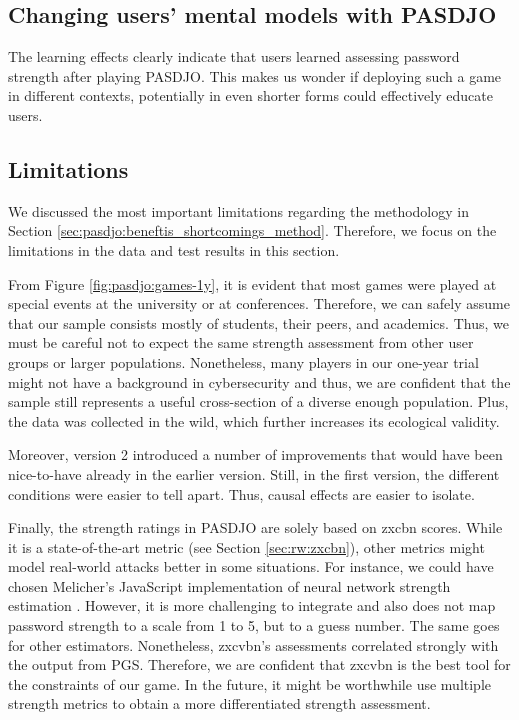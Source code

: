 
\subsection{Changing users' mental models with PASDJO}
The learning effects clearly indicate that users learned assessing password strength after playing PASDJO. This makes us wonder if deploying such a game in different contexts, potentially in even shorter forms could effectively educate users. 

\subsection{Limitations}
We discussed the most important limitations regarding the methodology in Section \ref{sec:pasdjo:beneftis_shortcomings_method}. Therefore, we focus on the limitations in the data and test results in this section. 

From Figure \ref{fig:pasdjo:games-1y}, it is evident that most games were played at special events at the university or at conferences. Therefore, we can safely assume that our sample consists mostly of students, their peers, and academics. Thus, we must be careful not to expect the same strength assessment from other user groups or larger populations. Nonetheless, many players in our one-year trial might not have a background in cybersecurity and thus, we are confident that the sample still represents a useful cross-section of a diverse enough population. Plus, the data was collected in the wild, which further increases its ecological validity. 

Moreover, version 2 introduced a number of improvements that would have been nice-to-have already in the earlier version. Still, in the first version, the different conditions were easier to tell apart. Thus, causal effects are easier to isolate. 

Finally, the strength ratings in PASDJO are solely based on zxcbn scores. While it is a state-of-the-art metric (see Section \ref{sec:rw:zxcbn}), other metrics might model real-world attacks better in some situations. For instance, we could have chosen Melicher's JavaScript implementation of neural network strength estimation \cite{Melicher2016NeuralNetworks}. However, it is more challenging to integrate and also does not map password strength to a scale from 1 to 5, but to a guess number. The same goes for other estimators. Nonetheless, zxcvbn's assessments correlated strongly with the output from \gls{PGS}. Therefore, we are confident that zxcvbn is the best tool for the constraints of our game. In the future, it might be worthwhile use multiple strength metrics to obtain a more differentiated strength assessment.

